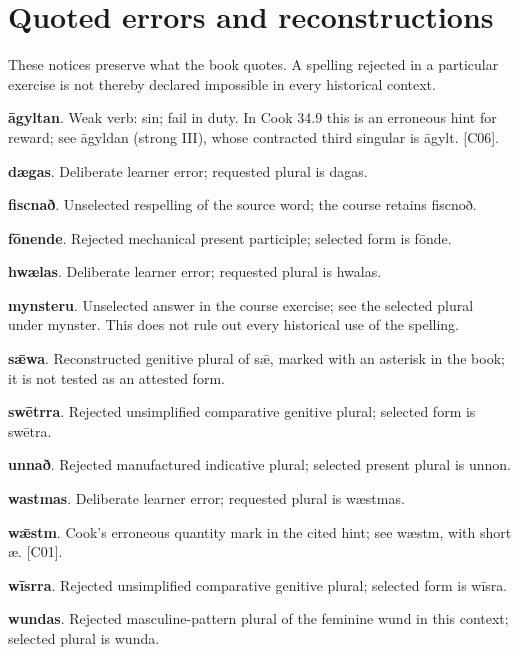 \section*{Quoted errors and reconstructions}
These notices preserve what the book quotes. A spelling rejected in a particular exercise is not thereby declared impossible in every historical context.\par
\textbf{āgyltan}. Weak verb: sin; fail in duty. In Cook 34.9 this is an erroneous hint for reward; see āgyldan (strong III), whose contracted third singular is āgylt. [C06].\par
\textbf{dægas}. Deliberate learner error; requested plural is dagas.\par
\textbf{fiscnað}. Unselected respelling of the source word; the course retains fiscnoð.\par
\textbf{fōnende}. Rejected mechanical present participle; selected form is fōnde.\par
\textbf{hwælas}. Deliberate learner error; requested plural is hwalas.\par
\textbf{mynsteru}. Unselected answer in the course exercise; see the selected plural under mynster. This does not rule out every historical use of the spelling.\par
\textbf{sǣwa}. Reconstructed genitive plural of sǣ, marked with an asterisk in the book; it is not tested as an attested form.\par
\textbf{swētrra}. Rejected unsimplified comparative genitive plural; selected form is swētra.\par
\textbf{unnað}. Rejected manufactured indicative plural; selected present plural is unnon.\par
\textbf{wastmas}. Deliberate learner error; requested plural is wæstmas.\par
\textbf{wǣstm}. Cook’s erroneous quantity mark in the cited hint; see wæstm, with short æ. [C01].\par
\textbf{wīsrra}. Rejected unsimplified comparative genitive plural; selected form is wīsra.\par
\textbf{wundas}. Rejected masculine-pattern plural of the feminine wund in this context; selected plural is wunda.\par

\par\label{end-glossary-old-english}
\clearpage\endgroup
